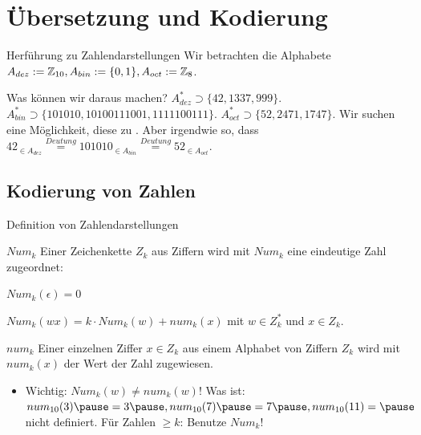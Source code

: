 \documentclass{beamer}
\begin{document}

\begin{frame}
	\titlepage
\end{frame}

\section{Übersetzung und Kodierung}

\begin{frame}{Herführung zu Zahlendarstellungen}
	\pause Wir betrachten die Alphabete $A_{dez} := \mathbb{Z}_{10}, A_{bin} := \{0, 1\}, A_{oct} := \mathbb{Z}_8$.
	\begin{itemize}
		\pitem Was können wir daraus machen?
		\pitem $A_{dez}^* \supset \{42, 1337, 999\}$.
		\pitem $A_{bin}^* \supset \{101010, 10100111001, 1111100111\}$.
		\pitem $A_{oct}^* \supset \{52, 2471, 1747\}$.
		\pitem Wir suchen eine Möglichkeit, diese  zu .
		\pitem Aber irgendwie so, dass $42_{\in A_{dez}} \stackrel{Deutung}{=} 101010_{\in A_{bin}} \stackrel{Deutung}{=} 52_{\in A_{oct}}$.
	\end{itemize}
\end{frame}

\subsection{Kodierung von Zahlen}

\begin{frame}{Definition von Zahlendarstellungen}
	\pause
	
	\begin{block}{$Num_k$}
		Einer Zeichenkette $Z_k$ aus Ziffern \p wird mit $Num_k$ eine eindeutige Zahl zugeordnet:
		
		\vspace{.2cm}
		
		\vspace{.2cm}
		
		 \p $Num_k(\epsilon) = 0$
		
		\vspace{.2cm}
		
		 \p $Num_k(wx) = k \cdot Num_k(w) + num_k(x)$ mit $w \in Z_k^*$ und $x \in Z_k$.
	\end{block}

	\pause
	
	\begin{block}{$num_k$}
		Einer einzelnen Ziffer $x \in Z_k$ aus einem Alphabet von Ziffern $Z_k$ wird mit $num_k(x)$ der Wert der Zahl zugewiesen.
	\end{block}

	\pause
	
	\begin{itemize}
		\item Wichtig: $Num_k(w) \neq num_k(w)$!
		\pitem Was ist: $num_{10}(3) \p = 3\p , num_{10}(7) \p = 7\p , num_{10}(11) = \p $ nicht definiert.
		\pitem Für Zahlen $\geq k$: Benutze $Num_k$!
	\end{itemize}
\end{frame}
\end{document}
